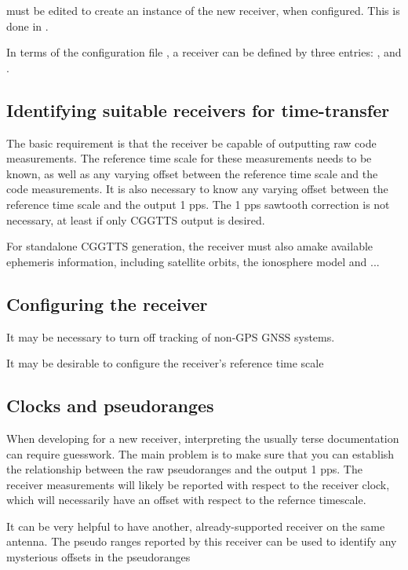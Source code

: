  must be edited to create an instance of the new receiver, when configured.
This is done in .

In terms of the configuration file , a receiver can be defined by three entries:
,  and .

\subsection{Identifying suitable receivers for time-transfer}

The basic requirement is that the receiver be capable of outputting raw code measurements.
The reference time scale for these measurements needs to be known, as well as any varying offset between
the reference time scale and the code measurements. It is also necessary to know any varying offset
between the reference time scale and the output 1 pps. The 1 pps sawtooth correction is not necessary,
at least if only CGGTTS output is desired.

For standalone CGGTTS generation, the receiver must also amake available ephemeris information, including
satellite orbits, the ionosphere model and ...


\subsection{Configuring the receiver}

It may be necessary to turn off tracking of non-GPS GNSS systems.

It may be desirable to configure the receiver's reference time scale 
\subsection{Clocks and pseudoranges}

When developing for a new receiver, interpreting the usually terse documentation can require
guesswork. The main problem is to make sure that you can establish the relationship between the raw 
pseudoranges and the output 1 pps. The receiver measurements will likely be reported with respect to the 
receiver clock, which will necessarily have an offset with respect to the refernce timescale.

It can be very helpful to have another, already-supported receiver on the same antenna. The pseudo ranges reported 
by this receiver can be used to identify any mysterious offsets in the pseudoranges 

